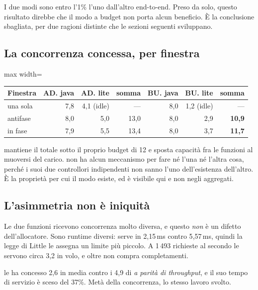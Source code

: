 I due modi sono entro l'1\% l'uno dall'altro end-to-end. Preso da solo, questo
risultato direbbe che il modo a budget non porta alcun beneficio. \`E la
conclusione sbagliata, per due ragioni distinte che le sezioni seguenti
sviluppano.

\subsection{La concorrenza concessa, per finestra}

\begin{center}
\small
\begin{adjustbox}{max width=\textwidth}
\begin{tabular}{@{}lrrrrrr@{}}
\toprule
\textbf{Finestra} & \textbf{AD. java} & \textbf{AD. lite} & \textbf{somma} &
\textbf{BU. java} & \textbf{BU. lite} & \textbf{somma} \\
\midrule
una sola & 7{,}8 & 4{,}1 (idle) & --- & 8{,}0 & 1{,}2 (idle) & --- \\
antifase & 8{,}0 & 5{,}0 & 13{,}0 & 8{,}0 & 2{,}9 & \textbf{10{,}9} \\
in fase & 7{,}9 & 5{,}5 & 13{,}4 & 8{,}0 & 3{,}7 & \textbf{11{,}7} \\
\bottomrule
\end{tabular}
\end{adjustbox}
\end{center}

 mantiene il totale sotto il proprio budget di 12 e sposta
capacit\`a fra le funzioni al muoversi del carico.  non
ha alcun meccanismo per fare n\'e l'una n\'e l'altra cosa, perch\'e i suoi due
controllori indipendenti non sanno l'uno dell'esistenza dell'altro. \`E la
propriet\`a per cui il modo esiste, ed \`e visibile qui e non negli aggregati.

\subsection{L'asimmetria non \`e iniquit\`a}

Le due funzioni ricevono concorrenza molto diversa, e questo \emph{non} \`e un
difetto dell'allocatore. Sono runtime diversi:  serve in 2{,}15\,ms
contro 5{,}57\,ms, quindi la legge di Little le assegna un limite pi\`u piccolo.
A 1\,493 richieste al secondo le servono circa 3{,}2 in volo, e oltre non compra
completamenti.

 le ha concesso 2{,}6 in media contro i 4{,}9 di
 \emph{a parit\`a di throughput}, e il suo tempo di servizio \`e
sceso del 37\%. Met\`a della concorrenza, lo stesso lavoro svolto.

